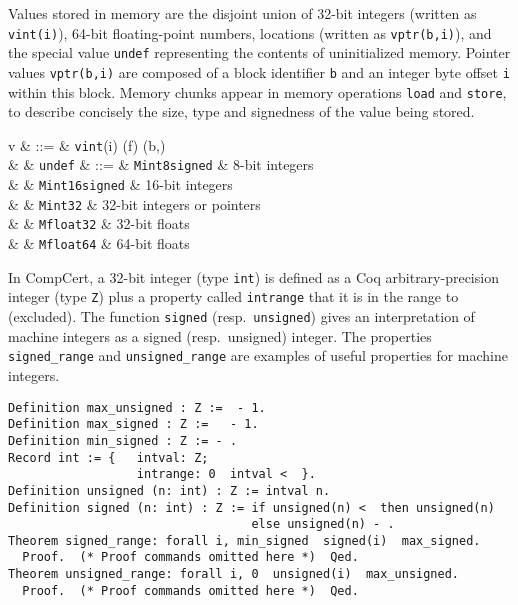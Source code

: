 Values stored in memory are the disjoint union of 32-bit
integers (written as  \lstinline!vint(i)!), 64-bit floating-point numbers,
locations (written as \lstinline!vptr(b,i)!), and the special value \lstinline!undef! representing the
contents of uninitialized memory. Pointer values \lstinline!vptr(b,i)! are
composed of a block identifier \lstinline!b! and an integer byte offset \lstinline!i! within this block. 
Memory chunks appear in memory operations \lstinline!load! and
\lstinline!store!, to describe concisely the size, type and signedness of the value being stored.
\begin{syntaxleft}
v & ::=  & {\tt vint}(i) (f) (b,\ofs) \\
& \mid & {\tt undef}
\chunk & ::= & {\tt Mint8signed}  & 8-bit integers \\
     & \mid& {\tt Mint16signed}  & 16-bit integers \\
     & \mid& {\tt Mint32} & 32-bit integers or pointers \\
     & \mid& {\tt Mfloat32} & 32-bit floats \\
     & \mid& {\tt Mfloat64} & 64-bit floats
\end{syntaxleft}

In CompCert, a 32-bit integer (type \lstinline!int!) is defined as 
a Coq arbitrary-precision integer (type \lstinline!Z!) plus a property called
\lstinline!intrange! that it
is in the range  to  (excluded). 
The function
\lstinline!signed! (resp.~\lstinline!unsigned!) gives an interpretation of machine 
integers as a signed (resp.~unsigned) integer. The properties 
\lstinline{signed_range} and \lstinline{unsigned_range} are examples
of useful properties for machine integers.


\begin{lstlisting}
Definition max_unsigned : Z :=  - 1.  
Definition max_signed : Z :=   - 1.
Definition min_signed : Z := - .
Record int := {   intval: Z;
                  intrange: 0  intval <  }.
Definition unsigned (n: int) : Z := intval n.
Definition signed (n: int) : Z := if unsigned(n) <  then unsigned(n) 
                                  else unsigned(n) - .
Theorem signed_range: forall i, min_signed  signed(i)  max_signed.
  Proof.  (* Proof commands omitted here *)  Qed.
Theorem unsigned_range: forall i, 0  unsigned(i)  max_unsigned.
  Proof.  (* Proof commands omitted here *)  Qed.
\end{lstlisting}


